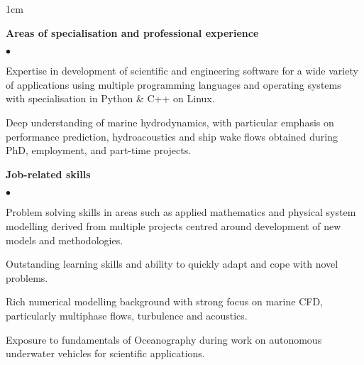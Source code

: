 \documentclass[a4paper,10pt]{article}
\newcommand{\squishlist}{
	\begin{list}{$\bullet$}
	{
		\setlength{\itemsep}{0pt}
		\setlength{\parsep}{0pt}
		\setlength{\topsep}{0pt}
		\setlength{\partopsep}{0pt}
		\setlength{\leftmargin}{2em}
		\setlength{\labelwidth}{1.5em}
		\setlength{\labelsep}{0.5em}
	}
}
\newcommand{\squishend}{\end{list}}
\begin{document}
\begin{minipage}{\textwidth}
\begin{adjustwidth}{}{1cm}

\textbf{Areas of specialisation and professional experience}
\squishlist
	\item Expertise in development of scientific and engineering software for a wide variety
		of applications using multiple programming languages and operating systems with
		specialisation in Python \& C++ on Linux.
	\item Deep understanding of marine hydrodynamics, with particular emphasis on
		performance prediction, hydroacoustics and ship wake flows obtained during PhD, employment, and part-time projects.
\squishend

\textbf{Job-related skills}
\squishlist
	\item Problem solving skills in areas such as applied mathematics and physical system modelling
		derived from multiple projects centred around development of new models and methodologies.
	\item Outstanding learning skills and ability to quickly adapt and cope with novel problems.
    \item Rich numerical modelling background with strong focus on marine CFD, particularly
        multiphase flows, turbulence and acoustics.
    \item Exposure to fundamentals of Oceanography during work on autonomous underwater vehicles
        for scientific applications.
\squishend


\end{adjustwidth}
\end{minipage}
\end{document}
